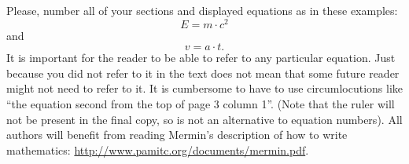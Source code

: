 Please, number all of your sections and displayed equations as in these examples:
\begin{equation}
  E = m\cdot c^2
  \label{eq:important}
\end{equation}
and
\begin{equation}
  v = a\cdot t.
  \label{eq:also-important}
\end{equation}
It is important for the reader to be able to refer to any particular equation.
Just because you did not refer to it in the text does not mean that some future reader might not need to refer to it.
It is cumbersome to have to use circumlocutions like ``the equation second from the top of page 3 column 1''.
(Note that the ruler will not be present in the final copy, so is not an alternative to equation numbers).
All authors will benefit from reading Mermin's description of how to write mathematics:
\url{http://www.pamitc.org/documents/mermin.pdf}.
